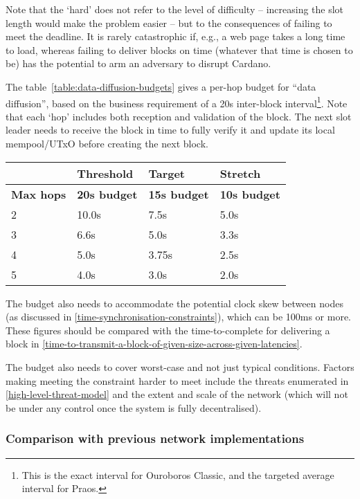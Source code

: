 \documentclass[11pt,a4paper]{article}
\begin{document}
Note that the `hard' does not refer to the level of difficulty --
increasing the slot length would make the problem easier -- but to the
consequences of failing to meet the deadline. It is rarely catastrophic
if, e.g., a web page takes a long time to load, whereas failing to
deliver blocks on time (whatever that time is chosen to be) has the
potential to arm an adversary to disrupt Cardano.

The table~\ref{table:data-diffusion-budgets} gives a per-hop budget for ``data
diffusion'', based on the business requirement of a 20s inter-block
interval\footnote{This is the exact interval for Ouroboros Classic, and the
targeted average interval for Praos.}. Note that each `hop' includes both
reception and validation of the block. The next slot leader needs to receive
the block in time to fully verify it and update its local mempool/UTxO before
creating the next block.

\begin{table}
  \caption{Data diffusion budgets}
  \label{table:data-diffusion-budgets}
\begin{longtable}[]{@{}llll@{}}
\toprule
& Threshold & Target & Stretch\tabularnewline
\midrule
\endhead
\textbf{Max hops} & \textbf{20s budget} & \textbf{15s budget} &
\textbf{10s budget}\tabularnewline
2 & 10.0s & 7.5s & 5.0s\tabularnewline
3 & 6.6s & 5.0s & 3.3s\tabularnewline
4 & 5.0s & 3.75s & 2.5s\tabularnewline
5 & 4.0s & 3.0s & 2.0s\tabularnewline
\bottomrule
\end{longtable}
\end{table}

The budget also needs to accommodate the potential clock skew between
nodes (as discussed in \cref{time-synchronisation-constraints}),
which can be 100ms or more. These figures should
be compared with the time-to-complete for delivering a block in
\cref{time-to-transmit-a-block-of-given-size-across-given-latencies}.

The budget also needs to cover worst-case and not just typical
conditions. Factors making meeting the constraint harder to meet include
the threats enumerated in
\cref{high-level-threat-model} and the extent and
scale of the network (which will not be under any control once the
system is fully decentralised).

\subsubsection{Comparison with previous network implementations}
\label{comparison-with-previous-network-implementations}
\end{document}
